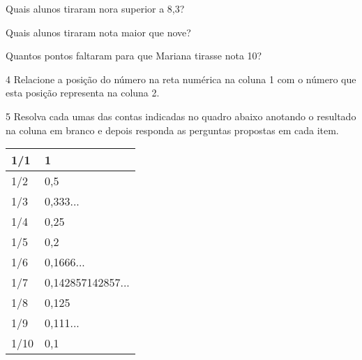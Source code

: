 
\begin{escolha}
\item
  Quais alunos tiraram nora superior a 8,3?


\item
  Quais alunos tiraram nota maior que nove?


\item
  Quantos pontos faltaram para que Mariana tirasse nota 10?

\end{escolha}


\num{4} Relacione a posição do número na reta numérica na coluna 1 com o
número que esta posição representa na coluna 2.



\num{5} Resolva cada umas das contas indicadas no quadro abaixo anotando o
resultado na coluna em branco e depois responda as perguntas propostas
em cada item.

\begin{longtable}[]{@{}ll@{}}
\toprule
1/1 & 1\tabularnewline
\midrule
\endhead
1/2 & 0,5\tabularnewline
1/3 & 0,333...\tabularnewline
1/4 & 0,25\tabularnewline
1/5 & 0,2\tabularnewline
1/6 & 0,1666...\tabularnewline
1/7 & 0,142857142857...\tabularnewline
1/8 & 0,125\tabularnewline
1/9 & 0,111...\tabularnewline
1/10 & 0,1\tabularnewline
\bottomrule
\end{longtable}

